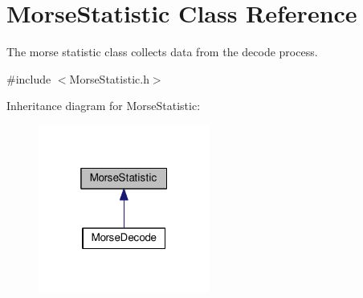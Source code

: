 \hypertarget{classMorseStatistic}{}\section{Morse\+Statistic Class Reference}
\label{classMorseStatistic}


The morse statistic class collects data from the decode process.  




{\ttfamily \#include $<$Morse\+Statistic.\+h$>$}



Inheritance diagram for Morse\+Statistic\+:\nopagebreak
\begin{figure}[H]
\begin{center}
\leavevmode
\includegraphics[width=160pt]{classMorseStatistic__inherit__graph}
\end{center}
\end{figure}
